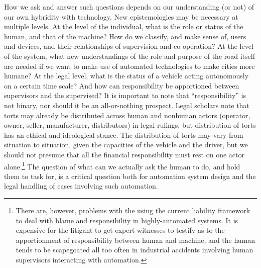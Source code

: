How we ask and answer such questions depends on our understanding (or
not) of our own hybridity with technology. New epistemologies may be
necessary at multiple levels. At the level of the individual, what is
the role or status of the human, and that of the machine? How do we
classify, and make sense of, users and devices, and their
relationships of supervision and co-operation? At the level of the
system, what new understandings of the role and purpose of the road
itself are needed if we want to make use of automated technologies to
make cities more humane? At the legal level, what is the status of a
vehicle acting autonomously on a certain time scale? And how can
responsibility be apportioned between supervisors and the supervised?
It is important to note that ``responsibility'' is not binary, nor
should it be an all-or-nothing prospect. Legal scholars note that
torts may already be distributed across human and nonhuman actors
(operator, owner, seller, manufacturer, distributors) in legal
rulings, but distribution of torts has an ethical
and ideological stance\cite{???-suemycar,etc}. The distribution of
torts may vary from situation to situation, given the capacities of
the vehicle and the driver\cite{???-disableddriverexample}, but we
should not presume that all the financial responsibility must rest on
one actor alone.\footnote{There are, however, problems with the using
  the current liability framework to deal with blame and
  responsibility in highly-automated systems. It is expensive for the
litigant to get expert witnesses to testify as to the apportionment of
responsibility between human and machine, and the human tends to be
scapegoated all too often in industrial accidents involving human
supervisors interacting with automation.} 
The question of what can we actually ask the human to do, and hold them to task
for, is a critical question both for automation system design and the
legal handling of cases involving such automation.


